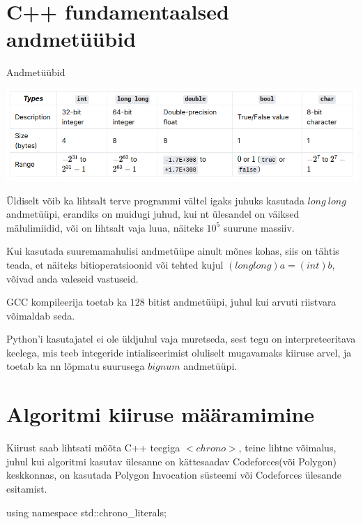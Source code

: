 \documentclass{trkut}
\begin{document}
\begin{appendices}
\chapter{C++ fundamentaalsed andmetüübid}\label{lisa4}
    \tiny
    \normalsize
    
    \begin{table}[H]%
    \caption{Andmetüübid}%
    \includegraphics[width=14cm]{datatypes.png}%
    \label{pragmas}%
    \end{table}

    Üldiselt võib ka lihtsalt terve programmi vältel igaks juhuks kasutada $long\ long$ andmetüüpi, erandiks on muidugi juhud, kui nt ülesandel on väiksed mälulimiidid, või on lihtsalt vaja luua, näiteks $10^5$ suurune massiiv.

    Kui kasutada suuremamahulisi andmetüüpe ainult mõnes kohas, siis on tähtis teada, et näiteks bitioperatsioonid või tehted kujul $(long long) a = (int) b$, võivad anda valeseid vastuseid.

    GCC kompileerija toetab ka $128$ bitist andmetüüpi, juhul kui arvuti riistvara võimaldab seda.
    
    Python'i kasutajatel ei ole üldjuhul vaja muretseda, sest tegu on interpreteeritava keelega, mis teeb integeride intialiseerimist oluliselt mugavamaks kiiruse arvel, ja toetab ka nn lõpmatu suurusega $bignum$ andmetüüpi\parencite{usaco2}.

 \chapter{Algoritmi kiiruse määramimine}\label{lisa5}
    \tiny
    \normalsize
    Kiirust saab lihtsati mõõta C++ teegiga $<chrono>$, teine lihtne võimalus, juhul kui algoritmi kasutav ülesanne on kättesaadav Codeforces(või Polygon) keskkonnas, on 
    kasutada Polygon Invocation süsteemi või Codeforces ülesande esitamist.

    \begin{cclol}
using namespace std::chrono_literals;


\end{cclol}
\end{appendices}
\end{document}
